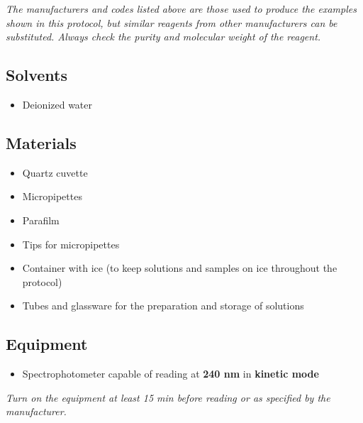 \documentclass[
  9pt,
  american,
  a5paper,
  extrafontsizes,onecolumn,openright
  ]{memoir}
\providecommand{\tightlist}{%
  \setlength{\itemsep}{0pt}\setlength{\parskip}{0pt}}
\begin{document}
\begin{greybox}[frametitle = Note]
\emph{The manufacturers and codes listed above are those used to produce the examples shown in this protocol, but similar reagents from other manufacturers can be substituted. Always check the purity and molecular weight of the reagent.}

\end{greybox}

\subsection{Solvents}\label{solvents}

\begin{itemize}
\tightlist
\item
  Deionized water
\end{itemize}

\subsection{Materials}\label{materials}

\begin{itemize}
\tightlist
\item
  Quartz cuvette
\item
  Micropipettes
\item
  Parafilm
\item
  Tips for micropipettes
\item
  Container with ice (to keep solutions and samples on ice throughout the protocol)
\item
  Tubes and glassware for the preparation and storage of solutions
\end{itemize}

\subsection{Equipment}\label{equipment}

\begin{itemize}
\tightlist
\item
  Spectrophotometer capable of reading at \textbf{240 nm} in \textbf{kinetic mode}
\end{itemize}

\begin{greybox}[frametitle=Note]
\emph{Turn on the equipment at least 15 min before reading or as specified by the manufacturer.}

\end{greybox}
\end{document}
